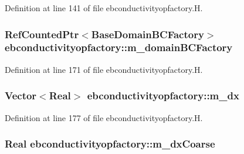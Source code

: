 Definition at line 141 of file ebconductivityopfactory.\+H.

\subsubsection[{\texorpdfstring{m\+\_\+domain\+B\+C\+Factory}{m_domainBCFactory}}]{\setlength{\rightskip}{0pt plus 5cm}Ref\+Counted\+Ptr$<$Base\+Domain\+B\+C\+Factory$>$ ebconductivityopfactory\+::m\+\_\+domain\+B\+C\+Factory\hspace{0.3cm}{\ttfamily [protected]}}\hypertarget{classebconductivityopfactory_a56a9491fa97b715ae7ade7d01e20cf25}{}\label{classebconductivityopfactory_a56a9491fa97b715ae7ade7d01e20cf25}


Definition at line 171 of file ebconductivityopfactory.\+H.

\subsubsection[{\texorpdfstring{m\+\_\+dx}{m_dx}}]{\setlength{\rightskip}{0pt plus 5cm}Vector$<$Real$>$ ebconductivityopfactory\+::m\+\_\+dx\hspace{0.3cm}{\ttfamily [protected]}}\hypertarget{classebconductivityopfactory_ace1375add529e30e75d78dc6436dbf94}{}\label{classebconductivityopfactory_ace1375add529e30e75d78dc6436dbf94}


Definition at line 177 of file ebconductivityopfactory.\+H.

\subsubsection[{\texorpdfstring{m\+\_\+dx\+Coarse}{m_dxCoarse}}]{\setlength{\rightskip}{0pt plus 5cm}Real ebconductivityopfactory\+::m\+\_\+dx\+Coarse\hspace{0.3cm}{\ttfamily [protected]}}\hypertarget{classebconductivityopfactory_aae199eebff435387cb02af0819293806}{}\label{classebconductivityopfactory_aae199eebff435387cb02af0819293806}


